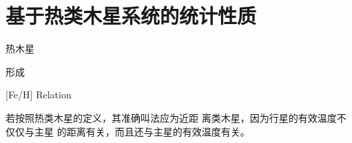 \chapter{基于热类木星系统的统计性质} \label{chapter:data_stat}

热木星

形成


[Fe/H] Relation


若按照热类木星的定义，其准确叫法应为近距
离类木星，因为行星的有效温度不仅仅与主星
的距离有关，而且还与主星的有效温度有关。